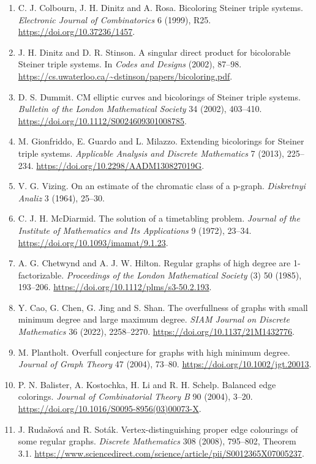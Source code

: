 \documentclass[english,11pt,a4paper]{article}
\providecommand{\tightlist}{\setlength{\itemsep}{0pt}\setlength{\parskip}{0pt}}
\begin{document}
\begin{enumerate}
\def\labelenumi{\arabic{enumi}.}
\tightlist
\item
  C. J. Colbourn, J. H. Dinitz and A. Rosa. Bicoloring Steiner triple systems. \emph{Electronic Journal of Combinatorics} 6 (1999), R25. \url{https://doi.org/10.37236/1457}.
\item
  J. H. Dinitz and D. R. Stinson. A singular direct product for bicolorable Steiner triple systems. In \emph{Codes and Designs} (2002), 87--98. \url{https://cs.uwaterloo.ca/~dstinson/papers/bicoloring.pdf}.
\item
  D. S. Dummit. CM elliptic curves and bicolorings of Steiner triple systems. \emph{Bulletin of the London Mathematical Society} 34 (2002), 403--410. \url{https://doi.org/10.1112/S0024609301008785}.
\item
  M. Gionfriddo, E. Guardo and L. Milazzo. Extending bicolorings for Steiner triple systems. \emph{Applicable Analysis and Discrete Mathematics} 7 (2013), 225--234. \url{https://doi.org/10.2298/AADM130827019G}.
\item
  V. G. Vizing. On an estimate of the chromatic class of a p-graph. \emph{Diskretnyi Analiz} 3 (1964), 25--30.
\item
  C. J. H. McDiarmid. The solution of a timetabling problem. \emph{Journal of the Institute of Mathematics and Its Applications} 9 (1972), 23--34. \url{https://doi.org/10.1093/imamat/9.1.23}.
\item
  A. G. Chetwynd and A. J. W. Hilton. Regular graphs of high degree are 1-factorizable. \emph{Proceedings of the London Mathematical Society} (3) 50 (1985), 193--206. \url{https://doi.org/10.1112/plms/s3-50.2.193}.
\item
  Y. Cao, G. Chen, G. Jing and S. Shan. The overfullness of graphs with small minimum degree and large maximum degree. \emph{SIAM Journal on Discrete Mathematics} 36 (2022), 2258--2270. \url{https://doi.org/10.1137/21M1432776}.
\item
  M. Plantholt. Overfull conjecture for graphs with high minimum degree. \emph{Journal of Graph Theory} 47 (2004), 73--80. \url{https://doi.org/10.1002/jgt.20013}.
\item
  P. N. Balister, A. Kostochka, H. Li and R. H. Schelp. Balanced edge colorings. \emph{Journal of Combinatorial Theory B} 90 (2004), 3--20. \url{https://doi.org/10.1016/S0095-8956(03)00073-X}.
\item
  J. Rudašová and R. Soták. Vertex-distinguishing proper edge colourings of some regular graphs. \emph{Discrete Mathematics} 308 (2008), 795--802, Theorem 3.1. \url{https://www.sciencedirect.com/science/article/pii/S0012365X07005237}.

\end{enumerate}
\end{document}
